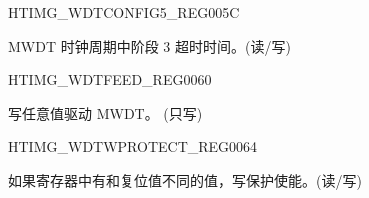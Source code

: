 \begin{register}{H}{TIMG\_WDTCONFIG5\_REG}{\hexprefix{}005C}\label{regdesc:TIMGWDTCONFIG5REG}
%
\regnewline%
\begin{regdesc}\begin{reglist}
\label{fielddesc:TIMGWDTSTG3HOLD}\item [TIMG\_WDT\_STG3\_HOLD] MWDT 时钟周期中阶段 3 超时时间。(读/写)
\end{reglist}\end{regdesc}
\end{register}


\begin{register}{H}{TIMG\_WDTFEED\_REG}{\hexprefix{}0060}\label{regdesc:TIMGWDTFEEDREG}
%
\regnewline%
\begin{regdesc}\begin{reglist}
\label{fielddesc:TIMGWDTFEED}\item [TIMG\_WDT\_FEED] 写任意值驱动 MWDT。 (只写)
\end{reglist}\end{regdesc}
\end{register}


\begin{register}{H}{TIMG\_WDTWPROTECT\_REG}{\hexprefix{}0064}\label{regdesc:TIMGWDTWPROTECTREG}
%
\regnewline%
\begin{regdesc}\begin{reglist}
\label{fielddesc:TIMGWDTWKEY}\item [TIMG\_WDT\_WKEY] 如果寄存器中有和复位值不同的值，写保护使能。(读/写)
\end{reglist}\end{regdesc}
\end{register}


